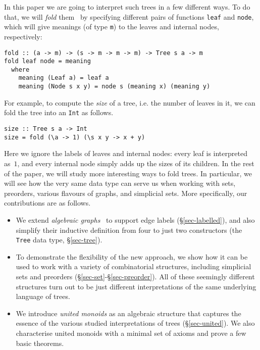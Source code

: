 \documentclass[english,submission]{programming}
\newcommand{\code}[1]{\lstinline[mathescape]|#1|}
\newcommand{\hcode}[1]{{\color{darkblue} \lstinline[keywordstyle={}]|#1|}} %
\begin{document}
\noindent
In this paper we are going to interpret such trees in a few different ways. To
do that, we will \emph{fold} them~\cite{gibbons_folds} by specifying different
pairs of functions \hcode{leaf} and \hcode{node}, which will give meanings (of
type \hcode{m}) to the leaves and internal nodes, respectively:

\begin{lstlisting}
fold :: (a -> m) -> (s -> m -> m -> m) -> Tree s a -> m
fold leaf node = meaning
  where
    meaning (Leaf a) = leaf a
    meaning (Node s x y) = node s (meaning x) (meaning y)
\end{lstlisting}

\noindent
For example, to compute the \emph{size} of a tree, i.e. the number of leaves in
it, we can fold the tree into an \code{Int} as follows.

\begin{lstlisting}
size :: Tree s a -> Int
size = fold (\a -> 1) (\s x y -> x + y)
\end{lstlisting}

\noindent
Here we ignore the labels of leaves and internal nodes: every leaf is
interpreted as~$1$, and every internal node simply adds up the sizes of its
children. In the rest of the paper, we will study more interesting ways to fold
trees. In particular, we will see how the very same data type can serve us when
working with sets, preorders, various flavours of graphs, and simplicial sets.
More specifically, our contributions are as follows.

\begin{itemize}
  \item We extend \emph{algebraic graphs}~\cite{mokhov_alga} to support edge
  labels (\S\ref{sec-labelled}), and also simplify their inductive definition
  from four to just two constructors (the \code{Tree} data type,
  \S\ref{sec-tree}).

  \item To demonstrate the flexibility of the new approach, we show how it can
  be used to work with a variety of combinatorial structures, including
  simplicial sets and preorders (\S\ref{sec-set}-\S\ref{sec-preorder}). All of
  these seemingly different structures turn out to be just different
  interpretations of the same underlying language of trees.

  \item We introduce \emph{united monoids} as an algebraic structure that
  captures the essence of the various studied interpretations of trees
  (\S\ref{sec-united}). We also characterise united monoids with a minimal set
  of axioms and prove a few basic theorems.
\end{itemize}
\end{document}
